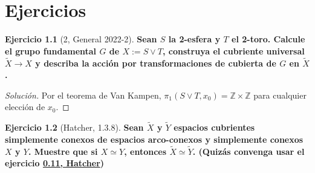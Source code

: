 \documentclass[spanish]{book}
\theoremstyle{definition}
\newtheorem*{ejer}{Ejercicio}
\newcommand{\Z}{\mathbb{Z}}
\begin{document}
\chapter{Ejercicios}
\begin{ejer}[2, General 2022-2]
	\textbf{Sean $S$ la 2-esfera y $T$ el 2-toro. Calcule el grupo fundamental $G$ de $X := S \vee T$, construya el cubriente universal $\widetilde{X} \to X$ y describa la acción por transformaciones de cubierta de $G$ en $\widetilde{X}$.}
	\begin{proof}[Solución] Por el teorema de Van Kampen, $\pi_1(S\vee T,x_0)=\Z\times\Z$ para cualquier elección de $x_0$.
	\end{proof}
\end{ejer}
\begin{ejer}[Hatcher, 1.3.8]
	\textbf{Sean $\tilde{X}$ y $\tilde{Y}$ espacios cubrientes simplemente conexos de espacios arco-conexos y simplemente conexos $X$ y $Y$. Muestre que si $X\simeq Y$, entonces $\tilde{X}\simeq\tilde{Y}$. (Quizás convenga usar el ejercicio \hyperref[hatcher:0.11]{0.11, Hatcher})}
\end{ejer}
\end{document}
